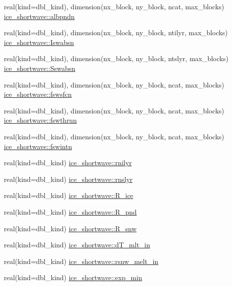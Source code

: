 \begin{DoxyCompactItemize}
\item 
real(kind=dbl\_\-kind), dimension(nx\_\-block, ny\_\-block, ncat, max\_\-blocks) \hyperlink{namespaceice__shortwave_ab92a8ce0d21135900c5bfefa5016d5a7}{ice\_\-shortwave::albpndn}
\item 
real(kind=dbl\_\-kind), dimension(nx\_\-block, ny\_\-block, ntilyr, max\_\-blocks) \hyperlink{namespaceice__shortwave_ab47843d78d636ebc26ad1cbccdd855e0}{ice\_\-shortwave::Iswabsn}
\item 
real(kind=dbl\_\-kind), dimension(nx\_\-block, ny\_\-block, ntslyr, max\_\-blocks) \hyperlink{namespaceice__shortwave_a174658715b844908a4691581fd3b83c9}{ice\_\-shortwave::Sswabsn}
\item 
real(kind=dbl\_\-kind), dimension(nx\_\-block, ny\_\-block, ncat, max\_\-blocks) \hyperlink{namespaceice__shortwave_a2b2e5ef90cc9c908da7af342c0988e59}{ice\_\-shortwave::fswsfcn}
\item 
real(kind=dbl\_\-kind), dimension(nx\_\-block, ny\_\-block, ncat, max\_\-blocks) \hyperlink{namespaceice__shortwave_a074d77add6f79e715c81aa6b4600bf98}{ice\_\-shortwave::fswthrun}
\item 
real(kind=dbl\_\-kind), dimension(nx\_\-block, ny\_\-block, ncat, max\_\-blocks) \hyperlink{namespaceice__shortwave_aeb385ab42b4e03ee1b8cde25541c1e64}{ice\_\-shortwave::fswintn}
\item 
real(kind=dbl\_\-kind) \hyperlink{namespaceice__shortwave_aadfde47ad01a2e1dae6a025ccd26c203}{ice\_\-shortwave::rnilyr}
\item 
real(kind=dbl\_\-kind) \hyperlink{namespaceice__shortwave_ad12f4239092092b69b1b300e947a1164}{ice\_\-shortwave::rnslyr}
\item 
real(kind=dbl\_\-kind) \hyperlink{namespaceice__shortwave_a24f28156b34d4f65677538c86071d9ae}{ice\_\-shortwave::R\_\-ice}
\item 
real(kind=dbl\_\-kind) \hyperlink{namespaceice__shortwave_aff78b63ae903ff25c0dac10823ea0c9b}{ice\_\-shortwave::R\_\-pnd}
\item 
real(kind=dbl\_\-kind) \hyperlink{namespaceice__shortwave_aa81b977d29eec195afdf7d4a8eed13df}{ice\_\-shortwave::R\_\-snw}
\item 
real(kind=dbl\_\-kind) \hyperlink{namespaceice__shortwave_a893d8a9d70334a9f7b5743e91d37cf92}{ice\_\-shortwave::dT\_\-mlt\_\-in}
\item 
real(kind=dbl\_\-kind) \hyperlink{namespaceice__shortwave_ab259ebc59a0a09d26c7242306435b662}{ice\_\-shortwave::rsnw\_\-melt\_\-in}
\item 
real(kind=dbl\_\-kind) \hyperlink{namespaceice__shortwave_a55ffdfb6fb5de60880330a142dfb398f}{ice\_\-shortwave::exp\_\-min}
\end{DoxyCompactItemize}
